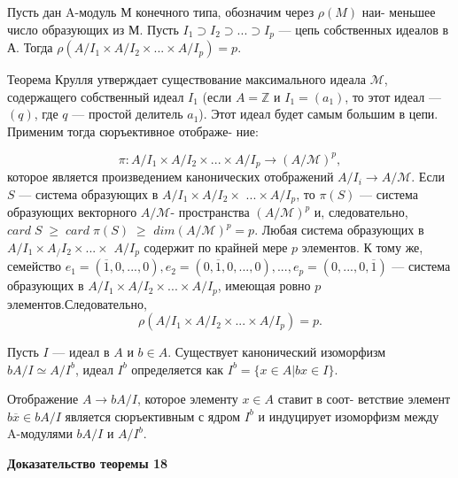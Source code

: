 \documentclass{mai_book}
\begin{document}
\begin{lemma}
Пусть дан A-модуль М конечного типа, обозначим через $\rho(M)$ наи- \linebreak меньшее число образующих из М.  
Пусть $I_1 \supset I_2 \supset ... \supset I_p$ --- цепь собственных идеалов в А. Тогда \linebreak $\rho(A/I_1 \times A/I_2 \times ... \times A/I_p) = p.$
\end{lemma}
\begin{myproof}
Теорема Крулля утверждает существование максимального идеала \linebreak $\mathcal{M}$, содержащего собственный идеал $I_1$
 (если $A = \mathbb{Z}$ и $I_1 = (a_1)$, то \linebreak этот идеал --- $(q)$, где $q$ — простой делитель $a_1$). Этот идеал будет \linebreak самым большим в цепи. Применим тогда сюръективное отображе- \linebreak ние:

$$\pi:A/I_1 \times A/I_2 \times ... \times A/I_p \to {(A/ \mathcal{M})}^p,$$
которое является произведением канонических отображений \linebreak $A/I_i \to A/ \mathcal{M}$. Если $S$ --- система образующих в $A/I_1 \times A/I_2 \times$ \linebreak $... \times A/I_p$, то $\pi(S)$ --- система образующих векторного $A/\mathcal{M}$- \linebreak пространства ${(A/\mathcal{M})}^p$ и, следовательно, $card \; S \; \ge \; card \; \pi(S) \; \ge$ \linebreak $dim{(A/ \mathcal{M})}^p = p$. Любая система образующих в $A/I_1 \times A_/I_2 \times ... \times$ \linebreak $A/I_p$ содержит по крайней мере $p$ элементов. К тому же, семейство \linebreak $e_1 = (\overline{1}, 0, ..., 0), e_2 = (0, \overline{1}, 0, ..., 0), ..., e_p = (0, ..., 0, \overline{1})$ --- система \linebreak образующих в $A/I_1 \times A/I_2 \times ... \times A/I_p$, имеющая ровно $p$ элементов.\linebreak Следовательно,  
$$\rho(A/I_1 \times A/I_2 \times ... \times A/I_p) = p.$$
\end{myproof}
\begin{lemma}
Пусть $I$ — идеал в $A$ и $b \in A$. Существует канонический изоморфизм \linebreak $bA/I \simeq A/I^b$, идеал $I^b$ определяется как $I^b = \{x \in A | bx \in I\}.$ 
\end{lemma}
\begin{myproof}
Отображение $A \to bA/I$, которое элементу $x \in A$ ставит в соот- \linebreak ветствие элемент $b\overline{x} \in bA/I$ является сюръективным с ядром $I^b$ и \linebreak индуцирует изоморфизм между A-модулями $bA/I$ и $A/I^b$.\par
\end{myproof}
\textbf{Доказательство теоремы 18}
\end{document}

